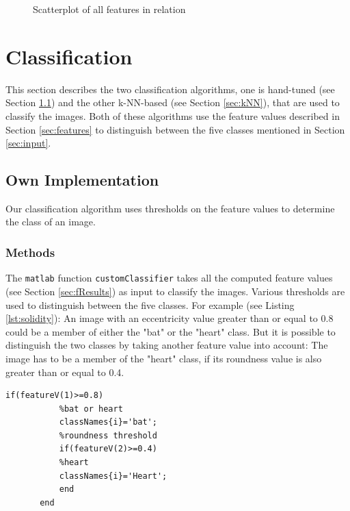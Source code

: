 \documentclass[a4paper,psfig,subfigure,epsfig,fleqn,amssmb,float,caption,fontenc,ausarbeitung]{article}
\begin{document}
\begin{figure}
	\centering
	\setlength\figureheight{4cm} 
	\setlength\figurewidth{10cm}
	
	\caption{Scatterplot of all features in relation}
	\label{fig:gscatter}
\end{figure}







\section{Classification}
\label{sec:classification}
This section describes the two classification algorithms, one is hand-tuned (see Section \ref{sec:own}) and the other k-NN-based (see Section \ref{sec:kNN}), that are used to classify the images. Both of these algorithms use the feature values described in Section \ref{sec:features} to distinguish between the five classes mentioned in Section \ref{sec:input}.

\subsection{Own Implementation}
\label{sec:own}
Our classification algorithm uses thresholds on the feature values to determine the class of an image.

\subsubsection{Methods}
\label{sec:ownMethods}
The {\tt matlab} function {\tt customClassifier} takes all the computed feature values (see Section \ref{sec:fResults}) as input to classify the images.
Various thresholds are used to distinguish between the five classes. For example (see Listing \ref{lst:solidity}): An image with an eccentricity value greater than or equal to 0.8 could be a member of either the "bat" or the "heart" class. But it is possible to distinguish the two classes by taking another feature value into account: The image has to be a member of the  "heart" class, if its roundness value is also greater than or equal to 0.4.

\begin{lstlisting}[caption=Example for two thresholds, label=lst:thresholdEx]
       if(featureV(1)>=0.8)
           %bat or heart
           classNames{i}='bat';         
           %roundness threshold
           if(featureV(2)>=0.4)
           %heart
           classNames{i}='Heart';                     
           end
       end
\end{lstlisting}
\end{document}
